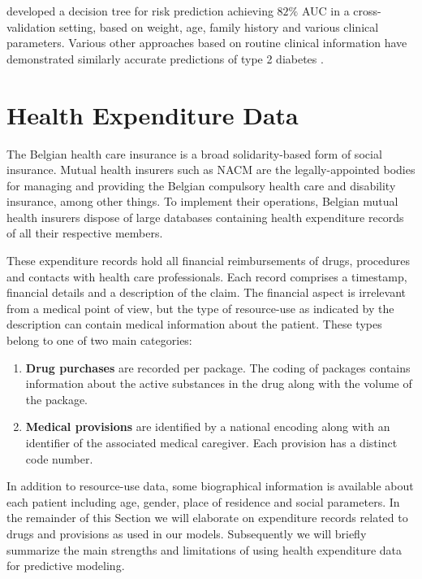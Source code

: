 \documentclass[twoside,11pt]{article}
\begin{document}
\citet{heikes2008diabetes} developed a decision tree for risk prediction achieving $82\%$ AUC in a cross-validation setting, based on weight, age, family history and various clinical parameters. Various other approaches based on routine clinical information have demonstrated similarly accurate predictions of type 2 diabetes \citep{stern2002identification, mcneely2003comparison}.


%
%

\section{Health Expenditure Data}
The Belgian health care insurance is a broad solidarity-based form of social insurance. Mutual health insurers such as NACM are the legally-appointed bodies for managing and providing the Belgian compulsory health care and disability insurance, among other things. To implement their operations, Belgian mutual health insurers dispose of large databases containing health expenditure records of all their respective members. 

These expenditure records hold all financial reimbursements of drugs, procedures and contacts with health care professionals. Each record comprises a timestamp, financial details and a description of the claim. The financial aspect is irrelevant from a medical point of view, but the type of resource-use as indicated by the description can contain medical information about the patient. These types belong to one of two main categories:
\begin{enumerate}
\item \textbf{Drug purchases} are recorded per package. The coding of packages contains information about the active substances in the drug along with the volume of the package.
\item \textbf{Medical provisions} are identified by a national encoding along with an identifier of the associated medical caregiver. Each provision has a distinct code number.
\end{enumerate}

In addition to resource-use data, some biographical information is available about each patient including age, gender, place of residence and social parameters. In the remainder of this Section we will elaborate on expenditure records related to drugs and provisions as used in our models. Subsequently we will briefly summarize the main strengths and limitations of using health expenditure data for predictive modeling.
\end{document}
